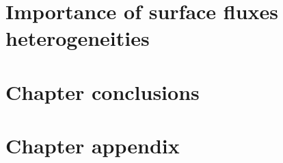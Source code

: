 \clearpage

\section{Importance of surface fluxes heterogeneities}
\clearpage

\section{Chapter conclusions}





\clearpage

\section{Chapter appendix}


